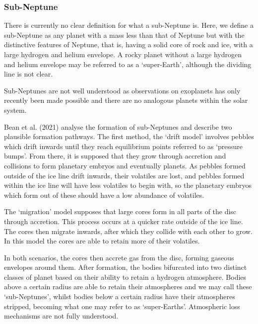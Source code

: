\documentclass[a4paper,twocolumn,12pt]{article}
\begin{document}
\subsubsection{Sub-Neptune}
There is currently no clear definition for what a sub-Neptune is. Here, we define a sub-Neptune as any planet with a mass less than that of Neptune but with the distinctive features of Neptune, that is, having a solid core of rock and ice, with a large hydrogen and helium envelope. A rocky planet without a large hydrogen and helium envelope may be referred to as a `super-Earth', although the dividing line is not clear.

Sub-Neptunes are not well understood as observations on exoplanets has only recently been made possible and there are no analogous planets within the solar system.


Bean et al. (2021)\cite{NatureAndOriginOfSubNeptunesGoodPaper} analyse the formation of sub-Neptunes and describe two plausible formation pathways. The first method, the `drift model' involves pebbles which drift inwards until they reach equilibrium points referred to as `pressure bumps'. From there, it is supposed that they grow through accretion and collisions to form planetary embryos and eventually planets. As pebbles formed outside of the ice line drift inwards, their volatiles are lost, and pebbles formed within the ice line will have less volatiles to begin with, so the planetary embryos which form out of these should have a low abundance of volatiles.

The `migration' model supposes that large cores form in all parts of the disc through accretion. This process occurs at a quicker rate outside of the ice line. The cores then migrate inwards, after which they collide with each other to grow. In this model the cores are able to retain more of their volatiles.

In both scenarios, the cores then accrete gas from the disc, forming gaseous envelopes around them. After formation, the bodies bifurcated into two distinct classes of planet based on their ability to retain a hydrogen atmosphere. Bodies above a certain radius are able to retain their atmospheres and we may call these `sub-Neptunes', whilst bodies below a certain radius have their atmospheres stripped, becoming what one may refer to as `super-Earths'. Atmospheric loss mechanisms are not fully understood.
\end{document}
